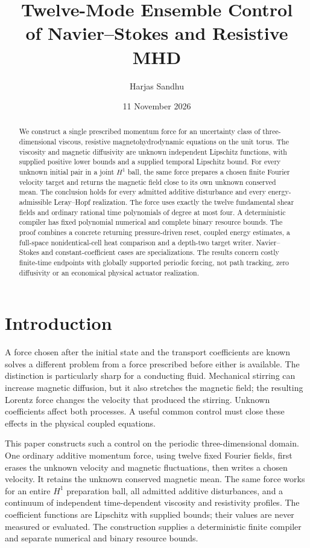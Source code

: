 \documentclass[11pt,a4paper]{amsart}
\title[Twelve-mode ensemble control of fluids]{Twelve-Mode Ensemble Control\\ of Navier--Stokes and Resistive MHD}
\author{Harjas Sandhu}
\date{11 November 2026}
\theoremstyle{definition}
\theoremstyle{remark}
\numberwithin{equation}{section}
\begin{document}
\begin{abstract}
We construct a single prescribed momentum force for an uncertainty class of three-dimensional viscous, resistive magnetohydrodynamic equations on the unit torus. The viscosity and magnetic diffusivity are unknown independent Lipschitz functions, with supplied positive lower bounds and a supplied temporal Lipschitz bound. For every unknown initial pair in a joint $H^1$ ball, the same force prepares a chosen finite Fourier velocity target and returns the magnetic field close to its own unknown conserved mean. The conclusion holds for every admitted additive disturbance and every energy-admissible Leray--Hopf realization. The force uses exactly the twelve fundamental shear fields and ordinary rational time polynomials of degree at most four. A deterministic compiler has fixed polynomial numerical and complete binary resource bounds. The proof combines a concrete returning pressure-driven reset, coupled energy estimates, a full-space nonidentical-cell heat comparison and a depth-two target writer. Navier--Stokes and constant-coefficient cases are specializations. The results concern costly finite-time endpoints with globally supported periodic forcing, not path tracking, zero diffusivity or an economical physical actuator realization.
\end{abstract}
\maketitle

\section{Introduction}\label{sec:introduction}
A force chosen after the initial state and the transport coefficients are known solves a different problem from a force prescribed before either is available. The distinction is particularly sharp for a conducting fluid. Mechanical stirring can increase magnetic diffusion, but it also stretches the magnetic field; the resulting Lorentz force changes the velocity that produced the stirring. Unknown coefficients affect both processes. A useful common control must close these effects in the physical coupled equations.

This paper constructs such a control on the periodic three-dimensional domain. One ordinary additive momentum force, using twelve fixed Fourier fields, first erases the unknown velocity and magnetic fluctuations, then writes a chosen velocity. It retains the unknown conserved magnetic mean. The same force works for an entire $H^1$ preparation ball, all admitted additive disturbances, and a continuum of independent time-dependent viscosity and resistivity profiles. The coefficient functions are Lipschitz with supplied bounds; their values are never measured or evaluated. The construction supplies a deterministic finite compiler and separate numerical and binary resource bounds.
\end{document}
